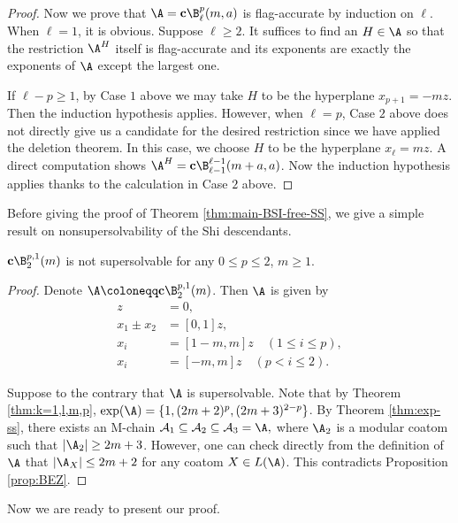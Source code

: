 \begin{proof}
Now we prove that $\A = \textbf{c}\B^p_\ell(m, a)$ is flag-accurate by induction on $\ell$.
When $\ell=1$, it is obvious. Suppose $\ell\ge2$. 
It suffices to find an $H \in \A$ so that the restriction $\A^H$ itself is flag-accurate and its exponents are exactly the exponents of $\A$ except the largest one. 

If $\ell-p\ge 1$, by Case $1$ above we may take $H$ to be the hyperplane $x_{p+1} = -mz$. 
Then the induction hypothesis applies. 
However, when $\ell=p$, Case $2$ above does not  directly give us a candidate for the desired restriction since we have applied the deletion theorem. 
In this case, we choose $H$ to be the hyperplane $x_\ell = mz$. 
A direct computation shows $\A^H= \textbf{c}\B^{\ell-1}_{\ell-1}(m+a, a)$. 
Now the induction hypothesis applies thanks to the calculation in Case $2$ above.
\end{proof}


Before giving the proof of  Theorem \ref{thm:main-BSI-free-SS}, we give a simple result on nonsupersolvability of the Shi descendants.

\begin{proposition}
 \label{prop:nonSS}
$ \mathbf{c}\B^{p,1}_2(m)$ is not supersolvable for any $0 \le p \le 2$, $m\ge1$.
\end{proposition}
\begin{proof}
Denote $\A \coloneqq  \mathbf{c}\B^{p,1}_2(m)$. Then $\A$  is given by 
\begin{align*}
z &= 0 , \\
x_1\pm x_2 &= [0,1]z, \\
x_i&=  [1-m , m]z \quad (1 \leq   i \leq p), \\
x_i&= [-m , m]z   \quad (p<  i \leq 2).
\end{align*}

Suppose to the contrary that $\A$ is  supersolvable. 
Note that by Theorem \ref{thm:k=1,l,m,p}, $\exp(\A) =  \{1, (2m+2)^{p}, (2m+3)^{2-p}\}$. 
By  Theorem \ref{thm:exp-ss}, there exists an M-chain $ \mathcal{A}_{1} \subseteq \mathcal{A}_{2} \subseteq \mathcal{A}_{3} = \A,$ where $\A_2$ is a modular coatom such that $|\A_{2}| \ge 2m+3$. 
However, one can check directly from the definition of $\A$ that $|\A_X| \le 2m+2$  for any coatom $X \in L(\A)$. 
This contradicts Proposition \ref{prop:BEZ}.
\end{proof}

Now we are ready to present our proof.

